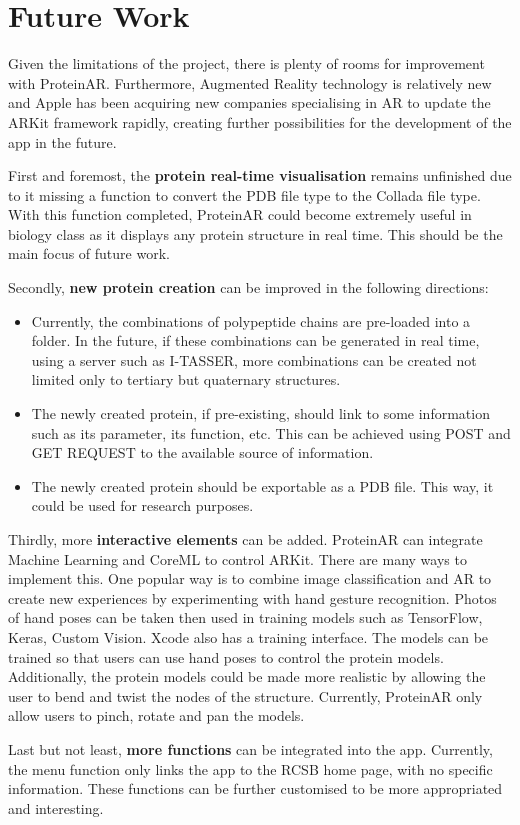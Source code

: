 \section{Future Work}
Given the limitations of the project, there is plenty of rooms for improvement with ProteinAR. Furthermore, Augmented Reality technology is relatively new and Apple has been acquiring new companies specialising in AR to update the ARKit framework rapidly, creating further possibilities for the development of the app in the future.

First and foremost, the \textbf{protein real-time visualisation} remains unfinished due to it missing a function to convert the PDB file type to the Collada file type. With this function completed, ProteinAR could become extremely useful in biology class as it displays any protein structure in real time. This should be the main focus of future work.

Secondly, \textbf {new protein creation} can be improved in the following directions:
\begin{itemize}
	\item Currently, the combinations of polypeptide chains are pre-loaded into a folder. In the future, if these combinations can be generated in real time, using a server such as I-TASSER, more combinations can be created not limited only to tertiary but quaternary structures.
	\item The newly created protein, if pre-existing, should link to some information such as its parameter, its function, etc. This can be achieved using POST and GET REQUEST to the available source of information.
	\item The newly created protein should be exportable as a PDB file. This way, it could be used for research purposes.
\end{itemize}

Thirdly, more \textbf{interactive elements} can be added. ProteinAR can integrate Machine Learning and CoreML to control ARKit. There are many ways to implement this. One popular way is to combine image classification and AR to create new experiences by experimenting with hand gesture recognition. Photos of hand poses can be taken then used in training models such as TensorFlow, Keras, Custom Vision. Xcode also has a training interface. The models can be trained so that users can use hand poses to control the protein models. Additionally, the protein models could be made more realistic by allowing the user to bend and twist the nodes of the structure. Currently, ProteinAR only allow users to pinch, rotate and pan the models.
 
Last but not least, \textbf{more functions} can be integrated into the app. Currently, the menu function only links the app to the RCSB home page, with no specific information. These functions can be further customised to be more appropriated and interesting. 


